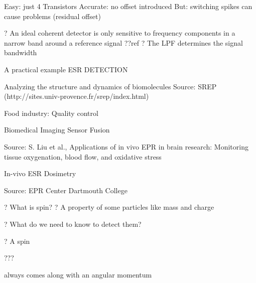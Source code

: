 \documentclass[2pt,landscape]{article}
\begin{document}
\begin{multicols*}{5}
\textbullet 	Easy: just 4 Transistors
\textbullet 	Accurate: no offset introduced
\textbullet 	But: switching spikes can cause 
problems (residual offset)















?	An ideal coherent detector 
is only sensitive to 
frequency components
in a narrow band around 
a reference signal ??ref
?	The LPF determines 
the signal bandwidth

























A practical example \textbullet 
ESR DETECTION






Analyzing the structure and dynamics of \textbullet biomolecules\textbullet 
Source: SREP (http://sites.univ-provence.fr/srep/index.html)


Food industry: Quality control









Biomedical Imaging \textbullet Sensor Fusion


Source: S. Liu et al., Applications of in vivo EPR in brain research: Monitoring tissue 
oxygenation, blood flow, and oxidative stress


In-vivo ESR Dosimetry


Source: EPR Center Dartmouth College



?	What is \textbullet spin\textbullet ?
?	A property of some particles like mass and charge


?	What do we need to know to detect them?



?	A spin


???


always comes 
along with an 
angular 
momentum



\end{multicols*}
\end{document}
